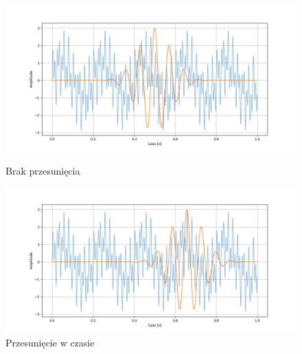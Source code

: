 \begin{figure}[ht]
    \centering
    \begin{minipage}[t]{0.47\linewidth}
        \includegraphics[width=\linewidth]{Rozdziały/02.Podstawy_teoretyczne/Obrazy/morlet_bez_przesuniecia.png}
        \caption{Brak przesunięcia}
        \label{fig:image34}
    \end{minipage}
    \centering
    \begin{minipage}[t]{0.47\linewidth}
        \includegraphics[width=\linewidth]{Rozdziały/02.Podstawy_teoretyczne/Obrazy/time_shift_morlet.png}
        \caption{Przesunięcie w czasie}
        \label{fig:image35}
    \end{minipage}
\end{figure}

